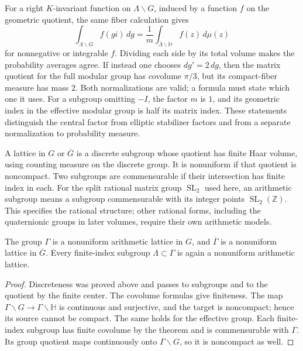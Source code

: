 \begin{remark}\label{modular.measure-dictionary}
For a right $K$-invariant function on $\Lambda\backslash G$, induced by a function $f$ on the geometric quotient, the same fiber calculation gives
\[
 \int_{\Lambda\backslash G}f(gi)\,dg
 =\frac1m\int_{\overline\Lambda\backslash\mathbb H}f(z)\,d\mu(z)
\]
for nonnegative or integrable $f$. Dividing each side by its total volume makes the probability averages agree. If instead one chooses $dg'=2\,dg$, then the matrix quotient for the full modular group has covolume $\pi/3$, but its compact-fiber measure has mass $2$. Both normalizations are valid; a formula must state which one it uses. For a subgroup omitting $-I$, the factor $m$ is $1$, and its geometric index in the effective modular group is half its matrix index. These statements distinguish the central factor from elliptic stabilizer factors and from a separate normalization to probability measure.
\end{remark}

\begin{definition}\label{modular.arithmetic-lattice}
A lattice in $G$ or $\overline G$ is a discrete subgroup whose quotient has finite Haar volume, using counting measure on the discrete group. It is nonuniform if that quotient is noncompact. Two subgroups are commensurable if their intersection has finite index in each. For the split rational matrix group $\operatorname{SL}_2$ used here, an arithmetic subgroup means a subgroup commensurable with its integer points $\operatorname{SL}_2(\mathbb Z)$. This specifies the rational structure; other rational forms, including the quaternionic groups in later volumes, require their own arithmetic models.
\end{definition}

\begin{corollary}\label{modular.lattice}
The group $\Gamma$ is a nonuniform arithmetic lattice in $G$, and $\overline\Gamma$ is a nonuniform lattice in $\overline G$. Every finite-index subgroup $\Lambda\subset\Gamma$ is again a nonuniform arithmetic lattice.
\end{corollary}

\begin{proof}
Discreteness was proved above and passes to subgroups and to the quotient by the finite center. The covolume formulas give finiteness. The map $\Gamma\backslash G\to\Gamma\backslash\mathbb H$ is continuous and surjective, and the target is noncompact; hence its source cannot be compact. The same holds for the effective group. Each finite-index subgroup has finite covolume by the theorem and is commensurable with $\Gamma$. Its group quotient maps continuously onto $\Gamma\backslash G$, so it is noncompact as well.
\end{proof}

